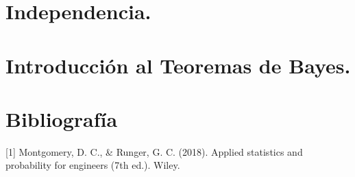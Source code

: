 \documentclass[
]{article}
\begin{document}
\hypertarget{independencia.}{%
\section{Independencia.}\label{independencia.}}

\hypertarget{introducciuxf3n-al-teoremas-de-bayes.}{%
\section{Introducción al Teoremas de
Bayes.}\label{introducciuxf3n-al-teoremas-de-bayes.}}

\hypertarget{bibliografuxeda}{%
\section{Bibliografía}\label{bibliografuxeda}}

{[}1{]} Montgomery, D. C., \& Runger, G. C. (2018). Applied statistics
and probability for engineers (7th ed.). Wiley.
\end{document}

